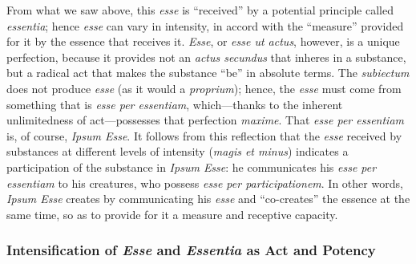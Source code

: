 From what we saw above, this \emph{esse} is ``received'' by a potential principle called \emph{essentia}; hence \emph{esse} can vary in intensity, in accord with the ``measure'' provided for it by the essence that receives it. \emph{Esse}, or \emph{esse ut actus}, however, is a unique perfection, because it provides not an \emph{actus secundus} that inheres in a substance, but a radical act that makes the substance ``be'' in absolute terms. The \emph{subiectum} does not produce \emph{esse} (as it would a \emph{proprium}); hence, the \emph{esse} must come from something that is \emph{esse per essentiam}, which---thanks to the inherent unlimitedness of act---possesses that perfection \emph{maxime}. That \emph{esse per essentiam} is, of course, \emph{Ipsum Esse}. It follows from this reflection that the \emph{esse} received by substances at different levels of intensity (\emph{magis et minus}) indicates a participation of the substance in \emph{Ipsum Esse}: he communicates his \emph{esse per essentiam} to his creatures, who possess \emph{esse per participationem}. In other words, \emph{Ipsum Esse} creates by communicating his \emph{esse} and ``co-creates'' the essence at the same time, so as to provide for it a measure and receptive capacity.

\subsubsection{Intensification of \emph{Esse} and \emph{Essentia} as Act and Potency}
\label{intensification}

